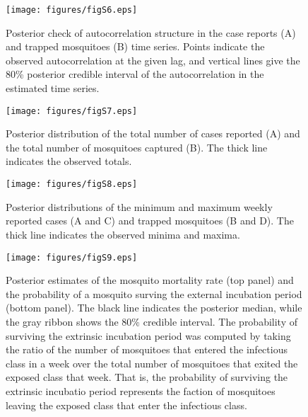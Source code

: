 \documentclass[12pt,letterpaper]{article}
\begin{document}
\begin{figure}[!h]
\texttt{[image: figures/figS6.eps]}
\caption{Posterior check of autocorrelation structure in the case reports (A) and trapped mosquitoes (B) time series.  Points indicate the observed autocorrelation at the given lag, and vertical lines give the 80\% posterior credible interval of the autocorrelation in the estimated time series.
}
\end{figure}

\begin{figure}[!h]
\texttt{[image: figures/figS7.eps]}
\caption{
Posterior distribution of the total number of cases reported (A) and the total number of mosquitoes captured (B).  The thick line indicates the observed totals.
}
\end{figure}

\begin{figure}[!h]
\texttt{[image: figures/figS8.eps]}
\caption{
Posterior distributions of the minimum and maximum weekly reported cases (A and C) and trapped mosquitoes (B and D). The thick line indicates the observed minima and maxima.
}
\end{figure}

\begin{figure}[!h]
\texttt{[image: figures/figS9.eps]}
\caption{
Posterior estimates of the mosquito mortality rate (top panel) and the probability of a mosquito surving the external incubation period (bottom panel).  The black line indicates the posterior median, while the gray ribbon shows the 80$\%$ credible interval.  The probability of surviving the extrinsic incubation period was computed by taking the ratio of the number of mosquitoes that entered the infectious class in a week over the total number of mosquitoes that exited the exposed class that week.  That is, the probability of surviving the extrinsic incubatio period represents the faction of mosquitoes leaving the exposed class that enter the infectious class. 
}
\end{figure}
\end{document}
